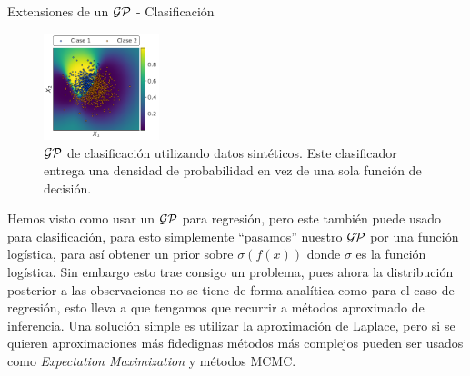 \documentclass[9pt]{beamer}
\begin{document}
\begin{frame}{Extensiones de un $\mathcal{GP}$ - Clasificación}
    \begin{figure}
        \centering
        \includegraphics[width=0.3\textwidth]{../img/cap8_classificacion}
        \caption{$\mathcal{GP}$ de clasificación utilizando datos sintéticos. Este clasificador entrega una densidad de probabilidad en vez de una sola función de decisión.}\label{fig:gp_8}
        \end{figure} 
        
        Hemos visto como usar un $\mathcal{GP}$ para regresión, pero este también puede usado para clasificación, para esto simplemente ``pasamos'' nuestro $\mathcal{GP}$ por una función logística, para así obtener un prior sobre $\sigma\left(f(x)\right)$ donde $\sigma$ es la función logística. Sin embargo esto trae consigo un problema, pues ahora la distribución posterior a las observaciones no se tiene de forma analítica como para el caso de regresión, esto lleva a que tengamos que recurrir a métodos aproximado de inferencia. Una solución simple es utilizar la aproximación de Laplace, pero si se quieren aproximaciones más fidedignas métodos más complejos pueden ser usados como \textit{Expectation Maximization} y métodos MCMC.
    
\end{frame}
\end{document}

